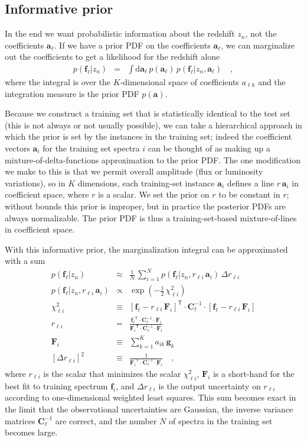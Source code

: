 \documentclass[preprint]{aastex}
\newcommand{\mmatrix}[1]{\boldsymbol{#1}}
\newcommand{\inverse}[1]{{#1}^{-1}}
\newcommand{\transpose}[1]{{#1}^{\mathsf{T}}}
\newcommand{\covar}{\mmatrix{C}}
\newcommand{\avec}{\mmatrix{a}}
\newcommand{\fvec}{\mmatrix{f}}
\newcommand{\Fvec}{\mmatrix{F}}
\newcommand{\gvec}{\mmatrix{g}}
\newcommand{\invvar}{\inverse{\covar}}
\newcommand{\dd}{\mathrm{d}}
\begin{document}
\subsection{Informative prior}

In the end we want probabilistic information about the redshift $z_n$,
not the coefficients $\avec_\ell$.  If we have a prior PDF on the
coefficients $\avec_\ell$, we can marginalize out the coefficients to
get a likelihood for the redshift alone
\begin{eqnarray}\displaystyle
p(\fvec_\ell|z_n) &=& \int \dd\avec_\ell\,p(\avec_\ell)\,p(\fvec_\ell|z_n,\avec_\ell)
\quad ,
\end{eqnarray}
where the integral is over the $K$-dimensional space of coefficients
$a_{\ell k}$ and the integration measure is the prior PDF $p(\avec)$.

Because we construct a training set that is statistically identical to
the test set (this is not always or not usually possible), we can take
a hierarchical approach in which the prior is set by the instances in
the training set; indeed the coefficient vectors $\avec_i$ for the
training set spectra $i$ can be thought of as making up a
mixture-of-delta-functions approximation to the prior PDF.  The one
modification we make to this is that we permit overall amplitude (flux
or luminosity variations), so in $K$ dimensions, each training-set
instance $\avec_i$ defines a line $r\,\avec_i$ in coefficient space,
where $r$ is a scalar.  We set the prior on $r$ to be constant in $r$;
without bounds this prior is improper, but in practice the posterior
PDFs are always normalizable.  The prior PDF is thus a
training-set-based mixture-of-lines in coefficient space.

With this informative prior, the marginalization integral can be
approximated with a sum
\begin{eqnarray}\displaystyle
p(\fvec_\ell|z_n) &\approx& \frac{1}{N}\,\sum_{i=1}^N p(\fvec_\ell|z_n,r_{\ell i}\,\avec_i)\,\Delta r_{\ell i} \nonumber\\
p(\fvec_\ell|z_n,r_{\ell i}\,\avec_i) &\propto& \exp(-\frac{1}{2}\,\chi^2_{\ell i}) \nonumber\\
\chi^2_{\ell i} &\equiv& \transpose{[\fvec_\ell - r_{\ell i}\,\Fvec_i]}\cdot\invvar_\ell\cdot[\fvec_\ell - r_{\ell i}\,\Fvec_i] \nonumber\\
r_{\ell i} &=& \frac{\transpose{\fvec_\ell}\cdot\invvar_\ell\cdot\Fvec_i}{\transpose{\Fvec_i}\cdot\invvar_\ell\cdot\Fvec_i} \nonumber\\
\Fvec_i &\equiv& \sum_{k=1}^K a_{ik}\,\gvec_k \nonumber\\
{}[\Delta r_{\ell i}]^2 &\equiv& \frac{1}{\transpose{\Fvec_i}\cdot\invvar_\ell\cdot\Fvec_i}
\quad ,
\end{eqnarray}
where $r_{\ell i}$ is the scalar that minimizes the scalar
$\chi^2_{\ell i}$, $\Fvec_i$ is a short-hand for the best fit to
training spectrum $\fvec_i$, and $\Delta r_{\ell i}$ is the output
uncertainty on $r_{\ell i}$ according to one-dimensional weighted
least squares.  This sum becomes exact in the limit that the
observational uncertainties are Gaussian, the inverse variance
matrices $\invvar_\ell$ are correct, and the number $N$ of spectra in
the training set becomes large.
\end{document}
